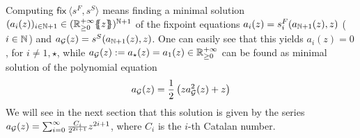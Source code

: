 \begin{example}
Computing $ \mathsf{fix}\  \langle s^F,s^S \rangle$ means finding a minimal solution $(a_i(z))_{i\in \mathbb{N}+1}\in({\mathbb{R}^{+\infty}_{\geq 0}}\{\!\!\{z\}\!\!\})^{\mathbb{N}+1}$ of the fixpoint equations $a_{i}(z)=s^F_i(a_{\mathbb{N}+1}(z),z)$ ($i\in\mathbb{N}$) and $a_{\mathcal{G}}(z)=s^S(a_{\mathbb{N} +1}(z),z)$.
One can easily see that this yields $a_{i}(z)=0$, for $i\neq 1,\star$, while $a_{\mathcal{G}}(z):=a_\star(z)=a_1(z)\in \mathbb{R}^{+\infty}_{\geq 0}$ can be found as minimal solution of the polynomial equation
\begin{equation}
\label{eq:alg1}
a_{\mathcal{G}}(z)=\frac{1}{2} \left (za_{\mathcal{G}}^2(z)+z\right)
\end{equation}
%
%
We will see in the next section that this solution is given by the series
$a_{\mathcal{G}}(z)=\sum_{i=0}^{\infty}\frac{C_i}{2^{2i+1}} z^{2i+1}$, where $C_i$ is the $i$-th Catalan number.
\end{example}

